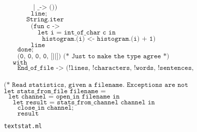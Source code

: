 \documentclass[]{book}
\begin{document}
\begin{figure}
\begin{center}
{\begin{minipage}{0.9\textwidth}
$\texttt{~~~~~~~~~~~~~| \_ -> ())}$\\
$\texttt{~~~~~~~~~~~~line;}$\\
$\texttt{~~~~~~~~~~String.iter}$\\
$\texttt{~~~~~~~~~~~~(fun c ->}$\\
$\texttt{~~~~~~~~~~~~~~~let i = int\_of\_char c in}$\\
$\texttt{~~~~~~~~~~~~~~~~~histogram.(i) <- histogram.(i) + 1)}$\\
$\texttt{~~~~~~~~~~~~line}$\\
$\texttt{~~~~~~done;}$\\
$\texttt{~~~~~~(0, 0, 0, 0, [||]) (* Just to make the type agree *)}$\\
$\texttt{~~~~with}$\\
$\texttt{~~~~~~End\_of\_file -> (!lines, !characters, !words, !sentences, histogram)}$\\
\\
$\texttt{(* Read statistics, given a filename.\ Exceptions are not handled *)}$\\
$\texttt{let stats\_from\_file filename =}$\\
$\texttt{~~let channel = open\_in filename in}$\\
$\texttt{~~~~let result = stats\_from\_channel channel in}$\\
$\texttt{~~~~~~close\_in channel;}$\\
$\texttt{~~~~~~result}$\vphantom{g}
\end{minipage}}
\end{center}
\caption{\small\texttt{textstat.ml}}
\label{q1.ml}
\end{figure}
\end{document}
